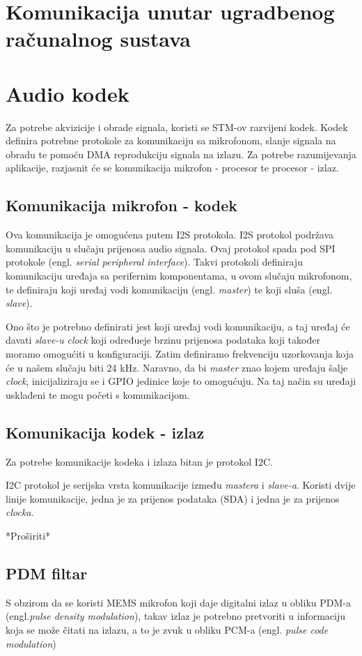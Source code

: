\documentclass[times, utf8, diplomski]{fer}
\begin{document}
\section{Komunikacija unutar ugradbenog računalnog sustava}
\section{Audio kodek}
Za potrebe akvizicije i obrade signala, koristi se STM-ov razvijeni kodek. Kodek definira potrebne protokole za komunikaciju sa mikrofonom, slanje signala na obradu te pomoću DMA reprodukciju signala na izlazu. Za potrebe razumijevanja aplikacije, razjasnit će se komunikacija mikrofon - procesor te procesor - izlaz.

\subsection{Komunikacija mikrofon - kodek}
Ova komunikacija je omogućena putem I2S protokola. I2S protokol podržava komunikaciju u slučaju prijenosa audio signala. Ovaj protokol spada pod SPI protokole (engl. \textit{serial peripheral interface}). Takvi protokoli definiraju komunikaciju uređaja sa perifernim komponentama, u ovom slučaju mikrofonom, te definiraju koji uređaj vodi komunikaciju (engl. \textit{master}) te koji sluša (engl. \textit{slave}).

Ono što je potrebno definirati jest koji uređaj vodi komunikaciju, a taj uređaj će davati \textit{slave-u} \textit{clock} koji određueje brzinu prijenosa podataka koji također moramo omogućiti u konfiguraciji. Zatim definiramo frekvenciju uzorkovanja koja će u našem slučaju biti 24 kHz. Naravno, da bi \textit{master} znao kojem uređaju šalje \textit{clock}, inicijaliziraju se i GPIO jedinice koje to omogućuju. Na taj način su uređaji usklađeni te mogu početi s komunikacijom.  

\subsection{Komunikacija kodek - izlaz}
Za potrebe komunikacije kodeka i izlaza bitan je protokol I2C.

I2C protokol je serijska vrsta komunikacije između \textit{mastera} i \textit{slave-a}. Koristi dvije linije komunikacije, jedna je za prijenos podataka (SDA) i jedna je za prijenos \textit{clocka}. 

*Proširiti*
\subsection{PDM filtar}
S obzirom da se koristi MEMS mikrofon koji daje digitalni izlaz u obliku PDM-a (engl.\textit{pulse density modulation}), takav izlaz je potrebno pretvoriti u informaciju koja se može čitati na izlazu, a to je zvuk u obliku PCM-a (engl. \textit{pulse code modulation})
\end{document}

